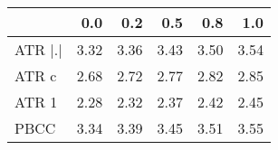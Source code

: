 \begin{tabular}{lrrrrr}
\toprule
 & 0.0 & 0.2 & 0.5 & 0.8 & 1.0 \\
\midrule
ATR |.| & 3.32 & 3.36 & 3.43 & 3.50 & 3.54 \\
ATR c & 2.68 & 2.72 & 2.77 & 2.82 & 2.85 \\
ATR 1 & 2.28 & 2.32 & 2.37 & 2.42 & 2.45 \\
PBCC & 3.34 & 3.39 & 3.45 & 3.51 & 3.55 \\
\bottomrule
\end{tabular}
